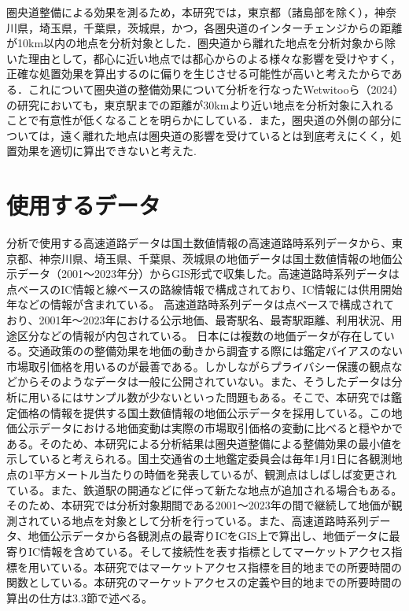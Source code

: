 \newpage
圏央道整備による効果を測るため，本研究では，東京都（諸島部を除く），神奈川県，埼玉県，千葉県，茨城県，かつ，各圏央道のインターチェンジからの距離が10km以内の地点を分析対象とした．圏央道から離れた地点を分析対象から除いた理由として，都心に近い地点では都心からのよる様々な影響を受けやすく，正確な処置効果を算出するのに偏りを生じさせる可能性が高いと考えたからである．これについて圏央道の整備効果について分析を行なったWetwitooら（2024）\cite{Weteitoo2024}の研究においても，東京駅までの距離が30kmより近い地点を分析対象に入れることで有意性が低くなることを明らかにしている．また，圏央道の外側の部分については，遠く離れた地点は圏央道の影響を受けているとは到底考えにくく，処置効果を適切に算出できないと考えた.

\section{使用するデータ}
分析で使用する高速道路データは国土数値情報の高速道路時系列データから、東京都、神奈川県、埼玉県、千葉県、茨城県の地価データは国土数値情報の地価公示データ（2001～2023年分）からGIS形式で収集した。高速道路時系列データは点ベースのIC情報と線ベースの路線情報で構成されており、IC情報には供用開始年などの情報が含まれている。
高速道路時系列データは点ベースで構成されており、2001年～2023年における公示地価、最寄駅名、最寄駅距離、利用状況、用途区分などの情報が内包されている。
日本には複数の地価データが存在している。交通政策のの整備効果を地価の動きから調査する際には鑑定バイアスのない市場取引価格を用いるのが最善である。しかしながらプライバシー保護の観点などからそのようなデータは一般に公開されていない。また、そうしたデータは分析に用いるにはサンプル数が少ないといった問題もある。そこで、本研究では鑑定価格の情報を提供する国土数値情報の地価公示データを採用している。\cite{shimizu2006}\cite{kunimi2021}この地価公示データにおける地価変動は実際の市場取引価格の変動に比べると穏やかである。そのため、本研究による分析結果は圏央道整備による整備効果の最小値を示していると考えられる。国土交通省の土地鑑定委員会は毎年1月1日に各観測地点の1平方メートル当たりの時価を発表しているが、観測点はしばしば変更されている。また、鉄道駅の開通などに伴って新たな地点が追加される場合もある。そのため、本研究では分析対象期間である2001～2023年の間で継続して地価が観測されている地点を対象として分析を行っている。また、高速道路時系列データ、地価公示データから各観測点の最寄りICをGIS上で算出し、地価データに最寄りIC情報を含めている。そして接続性を表す指標としてマーケットアクセス指標を用いている。本研究ではマーケットアクセス指標を目的地までの所要時間の関数としている。本研究のマーケットアクセスの定義や目的地までの所要時間の算出の仕方は3.3節で述べる。


